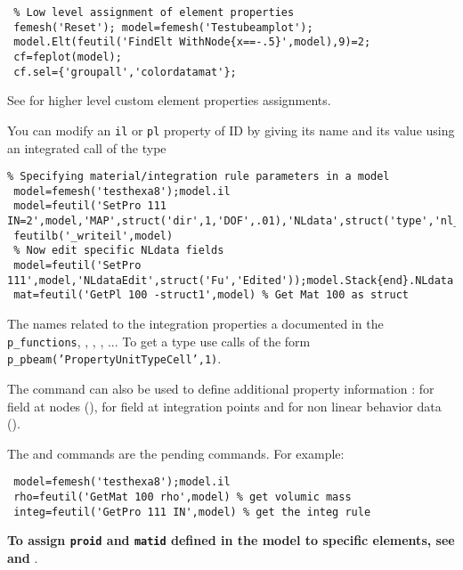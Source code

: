 \begin{verbatim}
 % Low level assignment of element properties
 femesh('Reset'); model=femesh('Testubeamplot');
 model.Elt(feutil('FindElt WithNode{x==-.5}',model),9)=2;
 cf=feplot(model); 
 cf.sel={'groupall','colordatamat'};
\end{verbatim}%

See  for higher level custom element properties assignments.


 You can modify an {\tt il} or {\tt pl} property of ID  by giving its name and its value using an integrated call of the type

\begin{verbatim}
% Specifying material/integration rule parameters in a model
 model=femesh('testhexa8');model.il
 model=feutil('SetPro 111 IN=2',model,'MAP',struct('dir',1,'DOF',.01),'NLdata',struct('type','nl_inout'));
 feutilb('_writeil',model)
 % Now edit specific NLdata fields
 model=feutil('SetPro 111',model,'NLdataEdit',struct('Fu','Edited'));model.Stack{end}.NLdata
 mat=feutil('GetPl 100 -struct1',model) % Get Mat 100 as struct
\end{verbatim}%

The names related to the integration properties a documented in the {\tt p\_functions}, \psolid, \pshell, \pbeam, ... To get a type use calls of the form {\tt p\_pbeam('PropertyUnitTypeCell',1)}. 

The command can also be used to define additional property information :  for field at nodes (),  for field at integration points and  for non linear behavior data (\nlspring). 

The  and  commands are the pending commands. For example:
\begin{verbatim}
 model=femesh('testhexa8');model.il
 rho=feutil('GetMat 100 rho',model) % get volumic mass
 integ=feutil('GetPro 111 IN',model) % get the integ rule
\end{verbatim}%
  
{\bf To assign {\tt proid} and {\tt matid} defined in the model to specific elements, see  and }.
  
